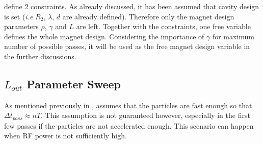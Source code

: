 \documentclass[a4paper,oneside,12pt]{report}
\numberwithin{equation}{chapter}
\begin{document}
 define 2 constraints. As already discussed, it has been assumed that cavity design is set (\textit{i.e} $R_2$, $\lambda$, $d$ are already defined).
Therefore only the magnet design parameters $\rho$, $\gamma$ and $L$ are left. Together with the constraints, one free variable defines the whole magnet design. 
Considering the importance of $\gamma$ for maximum number of possible passes, it will be used as the free magnet design variable in the further discussions.


\subsection{$L_{out}$ Parameter Sweep} \label{sec:parameter_sweep}

As mentioned previously in ,  assumes that the particles are fast enough so that $\Delta t_{pass} \approx n T$. 
This assumption is not guaranteed however, especially in the first few passes if the particles are not accelerated enough. 
This scenario can happen when RF power is not sufficiently high. 
\end{document}
